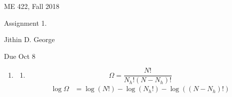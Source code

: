 \documentclass[letterpaper,12pt]{article}
\begin{document}




\noindent
{\scriptsize ME 422, Fall 2018} \hfill

\begin{center}
\large
Assignment 1.
\normalsize

Jithin D. George
\end{center}

\noindent
Due Oct 8
\vspace{.3in}




\noindent


\begin{enumerate}
\item

\begin{enumerate}
\item
\[ \Omega  = \frac{N!}{N_h!(N-N_h)!}\]
\begin{align*}
\log \Omega  &=\log(N!)-\log(N_h!)-\log((N-N_h)!)\\
\end{align*}


\end{enumerate}
\end{enumerate}
\end{document}
